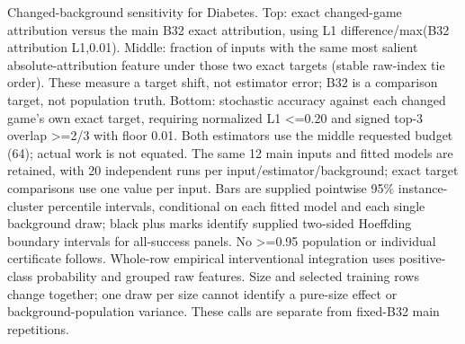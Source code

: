 Changed-background sensitivity for Diabetes. Top: exact changed-game attribution versus the main B32 exact attribution, using L1 difference/max(B32 attribution L1,0.01). Middle: fraction of inputs with the same most salient absolute-attribution feature under those two exact targets (stable raw-index tie order). These measure a target shift, not estimator error; B32 is a comparison target, not population truth. Bottom: stochastic accuracy against each changed game's own exact target, requiring normalized L1 <=0.20 and signed top-3 overlap >=2/3 with floor 0.01. Both estimators use the middle requested budget (64); actual work is not equated. The same 12 main inputs and fitted models are retained, with 20 independent runs per input/estimator/background; exact target comparisons use one value per input. Bars are supplied pointwise 95\% instance-cluster percentile intervals, conditional on each fitted model and each single background draw; black plus marks identify supplied two-sided Hoeffding boundary intervals for all-success panels. No >=0.95 population or individual certificate follows. Whole-row empirical interventional integration uses positive-class probability and grouped raw features. Size and selected training rows change together; one draw per size cannot identify a pure-size effect or background-population variance. These calls are separate from fixed-B32 main repetitions.
